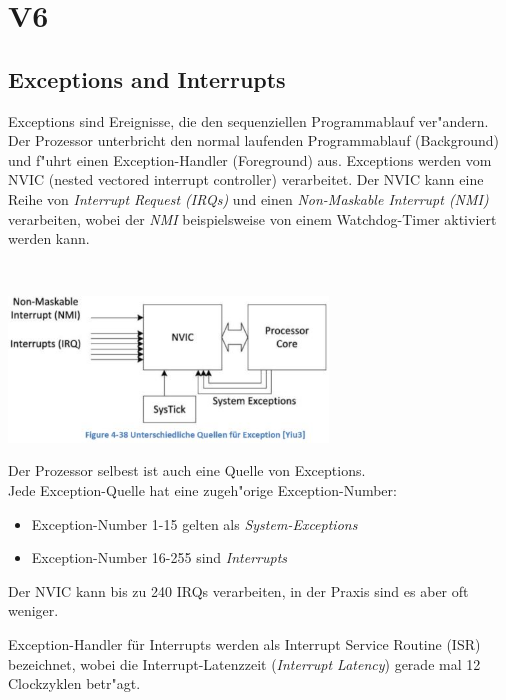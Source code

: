 \section{V6}
\subsection{Exceptions and Interrupts}\label{Exceptions}
\begin{minipage}{10cm}
	Exceptions sind Ereignisse, die den sequenziellen Programmablauf ver"andern. Der Prozessor unterbricht den normal laufenden Programmablauf (Background) und f"uhrt einen Exception-Handler (Foreground) aus. Exceptions werden vom NVIC (nested vectored interrupt controller) verarbeitet. Der NVIC kann eine Reihe von  \textit{Interrupt Request (IRQs)} und einen \textit{Non-Maskable Interrupt (NMI)} verarbeiten, wobei der \textit{NMI} beispielsweise von einem Watchdog-Timer aktiviert werden kann. 
\end{minipage}
%
\begin{minipage}{0.5cm}
	\-\
\end{minipage}
%
\begin{minipage}{9cm}
	\includegraphics[width=8.5cm]{images/NVICExcp}
\end{minipage}

Der Prozessor selbest ist auch eine Quelle von Exceptions.\\
Jede Exception-Quelle hat eine zugeh"orige Exception-Number:
        \begin{itemize}
        	\item Exception-Number 1-15 gelten als \textit{System-Exceptions}
        	\item Exception-Number 16-255 sind \textit{Interrupts}
        \end{itemize} 
        Der NVIC kann bis zu 240 IRQs verarbeiten, in der Praxis sind es aber oft weniger.
    
Exception-Handler für Interrupts werden als Interrupt Service Routine (ISR) bezeichnet, wobei die Interrupt-Latenzzeit (\textit{Interrupt Latency}) gerade mal 12 Clockzyklen betr"agt.

